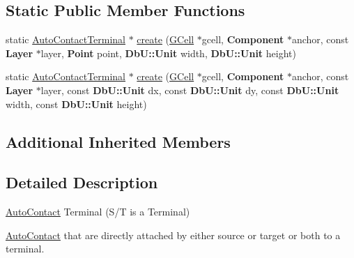 \subsection*{Static Public Member Functions}
\begin{DoxyCompactItemize}
\item 
static \hyperlink{classKatabatic_1_1AutoContactTerminal}{Auto\-Contact\-Terminal} $\ast$ \hyperlink{classKatabatic_1_1AutoContactTerminal_a0d440e51525b09acc843f1d345850487}{create} (\hyperlink{classKatabatic_1_1GCell}{G\-Cell} $\ast$gcell, {\bf Component} $\ast$anchor, const {\bf Layer} $\ast$layer, {\bf Point} point, {\bf Db\-U\-::\-Unit} width, {\bf Db\-U\-::\-Unit} height)
\item 
static \hyperlink{classKatabatic_1_1AutoContactTerminal}{Auto\-Contact\-Terminal} $\ast$ \hyperlink{classKatabatic_1_1AutoContactTerminal_a60a625bca2cdfebcdcc7826ab781d1bb}{create} (\hyperlink{classKatabatic_1_1GCell}{G\-Cell} $\ast$gcell, {\bf Component} $\ast$anchor, const {\bf Layer} $\ast$layer, const {\bf Db\-U\-::\-Unit} dx, const {\bf Db\-U\-::\-Unit} dy, const {\bf Db\-U\-::\-Unit} width, const {\bf Db\-U\-::\-Unit} height)
\end{DoxyCompactItemize}
\subsection*{Additional Inherited Members}


\subsection{Detailed Description}
\hyperlink{classKatabatic_1_1AutoContact}{Auto\-Contact} Terminal (S/\-T is a Terminal) 

\hyperlink{classKatabatic_1_1AutoContact}{Auto\-Contact} that are directly attached by either source or target or both to a terminal. 


